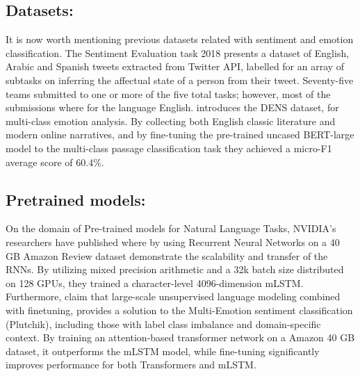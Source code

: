 \documentclass[11pt]{article}
\begin{document}
\subsection{Datasets:}
It is now worth mentioning previous datasets related with sentiment and emotion classification. The Sentiment Evaluation task 2018 \cite{mohammad-etal-2018-semeval} presents a dataset of English, Arabic and Spanish tweets extracted from Twitter API, labelled for an array of subtasks on inferring the affectual state of a person from their tweet. Seventy-five teams submitted to one or more of the five total tasks; however, most of the submissions where for the language English. 
\cite{liu2019dens} introduces the DENS dataset, for multi-class emotion analysis. By collecting both English classic literature and modern online narratives, and by fine-tuning the pre-trained uncased BERT-large model to the multi-class passage classification task they achieved a micro-F1 average score of 60.4\%.

\subsection{Pretrained models:}
On the domain of Pre-trained models for Natural Language Tasks, NVIDIA's researchers have published 
\cite{puri2018large} where by using Recurrent Neural Networks on a 40 GB Amazon Review dataset demonstrate 
the scalability and transfer of the RNNs. By utilizing mixed precision arithmetic and 
a 32k batch size distributed on 128 GPUs, they trained a character-level 4096-dimension mLSTM.
Furthermore, \cite{kant2018practical} claim that large-scale unsupervised language modeling combined 
with finetuning, provides a solution to the Multi-Emotion sentiment classification (Plutchik),
including those with label class imbalance and domain-specific context. By training an attention-based
transformer network on a Amazon 40 GB dataset, it outperforms the mLSTM model, while fine-tuning significantly 
improves performance for both Transformers and mLSTM.

\end{document}
